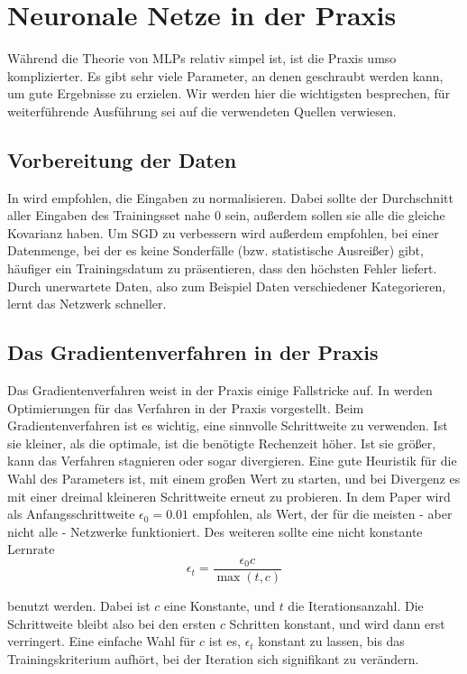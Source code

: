 \section{Neuronale Netze in der Praxis}
Während die Theorie von MLPs relativ simpel ist, ist die Praxis umso komplizierter. Es gibt sehr viele Parameter, an denen geschraubt werden kann, um gute Ergebnisse zu erzielen. Wir werden hier die wichtigsten besprechen, für weiterführende Ausführung sei auf die verwendeten Quellen verwiesen. 

\subsection{Vorbereitung der Daten}
In \cite{lecunefficient} wird empfohlen, die Eingaben zu normalisieren.
Dabei sollte der Durchschnitt aller Eingaben des Trainingsset nahe $0$ sein, außerdem sollen sie alle die gleiche Kovarianz haben.
Um SGD zu verbessern wird außerdem empfohlen, bei einer Datenmenge, bei der es keine Sonderfälle (bzw. statistische Ausreißer) gibt, häufiger ein Trainingsdatum zu präsentieren, dass den höchsten Fehler liefert. Durch unerwartete Daten, also zum Beispiel Daten verschiedener Kategorieren, lernt das Netzwerk schneller.

\subsection{Das Gradientenverfahren in der Praxis}
Das Gradientenverfahren weist in der Praxis einige Fallstricke auf. In \cite{bengio2012practical} werden Optimierungen für das Verfahren in der Praxis vorgestellt. 
Beim Gradientenverfahren ist es wichtig, eine sinnvolle Schrittweite zu verwenden. Ist sie kleiner, als die optimale, ist die benötigte Rechenzeit höher. Ist sie größer, kann das Verfahren stagnieren oder sogar divergieren. Eine gute Heuristik für die Wahl des Parameters ist, mit einem großen Wert zu starten, und bei Divergenz es mit einer dreimal kleineren Schrittweite erneut zu probieren.
In dem Paper wird als Anfangsschrittweite $\epsilon_0 = 0.01$ empfohlen, als Wert, der für die meisten - aber nicht alle - Netzwerke funktioniert.
Des weiteren sollte eine nicht konstante Lernrate 
\begin{equation}
	\epsilon_t = \frac{\epsilon_0 c}{\max(t, c)}
\end{equation}

benutzt werden. Dabei ist $c$ eine Konstante, und $t$ die Iterationsanzahl. Die Schrittweite bleibt also bei den ersten $c$ Schritten konstant, und wird dann erst verringert. Eine einfache Wahl für $c$ ist es, $\epsilon_t$ konstant zu lassen, bis das Trainingskriterium aufhört, bei der Iteration sich signifikant zu verändern.


